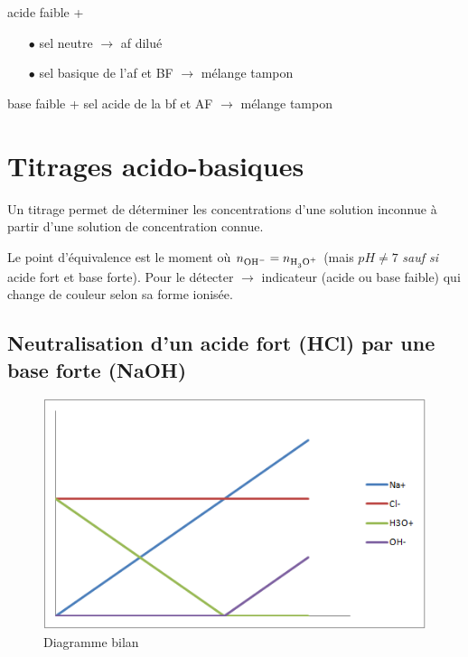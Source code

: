 \documentclass[11pt,a4paper,french]{article}
\newcommand\ph{\ensuremath{pH}}
\begin{document}
acide faible +
\begin{itemize}
\item[$\bullet$] sel neutre $\rightarrow$ af dilué
\item[$\bullet$] sel basique de l'af et BF $\rightarrow$ mélange tampon
\end{itemize}

base faible + sel acide de la bf et AF $\rightarrow$ mélange tampon

\section{Titrages acido-basiques}
Un titrage permet de déterminer les concentrations d'une solution inconnue à partir d'une solution de concentration connue.

Le point d'équivalence est le moment où $n_{\ce{OH-}} = n_{\ce{H3O+}}$ (mais $\ph\neq 7$ \emph{sauf si} acide fort et base forte).
Pour le détecter $\rightarrow$ indicateur (acide ou base faible) qui change de couleur selon sa forme ionisée.

\subsection{Neutralisation d'un acide fort (HCl) par une base forte (NaOH)}

\begin{figure}[ht!]
\centering
\includegraphics[scale=0.7]{DiagBilanAFBF.png}
\caption{Diagramme bilan}
\end{figure}
\end{document}
